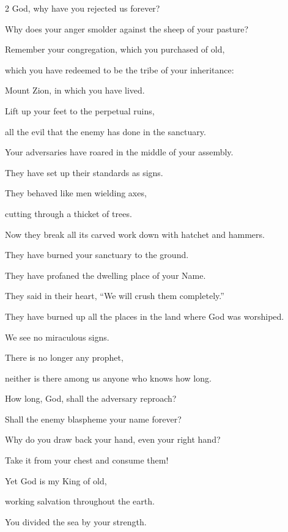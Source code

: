 \begin{multicols}{2}
	\quad \myverse*{}God, why have you rejected us forever?
	
	Why does your anger smolder against the sheep of your pasture?
	
	
	\myverse{}Remember your congregation, which you purchased of old,
	
	which you have redeemed to be the tribe of your inheritance:
	
	Mount Zion, in which you have lived.
	
	
	\myverse{}Lift up your feet to the perpetual ruins,
	
	all the evil that the enemy has done in the sanctuary.
	
	
	\myverse{}Your adversaries have roared in the middle of your assembly.
	
	They have set up their standards as signs.
	
	
	\myverse{}They behaved like men wielding axes,
	
	cutting through a thicket of trees.
	
	
	\myverse{}Now they break all its carved work down with hatchet and hammers.
	
	
	\myverse{}They have burned your sanctuary to the ground.
	
	They have profaned the dwelling place of your Name.
	
	
	\myverse{}They said in their heart, “We will crush them completely.”
	
	They have burned up all the places in the land where God was worshiped.
	
	
	\myverse{}We see no miraculous signs.
	
	There is no longer any prophet,
	
	neither is there among us anyone who knows how long.
	
	
	\myverse{}How long, God, shall the adversary reproach?
	
	Shall the enemy blaspheme your name forever?
	
	
	\myverse{}Why do you draw back your hand, even your right hand?
	
	Take it from your chest and consume them!
	
	\vspace{\baselineskip}
	
	\myverse{}Yet God is my King of old,
	
	working salvation throughout the earth.
	
	
	\myverse{}You divided the sea by your strength.
	

\end{multicols}
